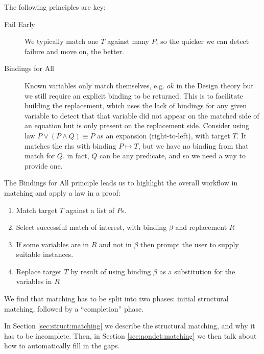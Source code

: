 The following principles are key:
\begin{description}
  \item[Fail Early]
    We typically match one $T$ against many $P$, so the quicker we
    can detect failure and move on, the better.
  \item[Bindings for All]
    Known variables only match themselves, e.g. $ok$ in the Design theory
    but we still require an explicit binding to be returned.
    This is to facilitate building the replacement,
    which uses the lack of bindings for any given variable to
    detect that that variable did not appear on the matched side of an equation
    but is only present on the replacement side.
    Consider using law $P \lor (P \land Q) \equiv P$
    as an expansion (right-to-left), with target $T$.
    It matches the rhs with binding $P \mapsto T$,
    but we have no binding from that match for $Q$.
    in fact, $Q$ can be any predicate, and so we need a way to provide one.
\end{description}
The Bindings for All principle leads us to highlight
the overall workflow in matching and apply a law in a proof:
\begin{enumerate}
  \item Match target $T$ against a list of $P$s.
  \item Select successful match of interest, with binding $\beta$
    and replacement $R$
  \item If some variables are in $R$ and not in $\beta$
      then prompt the user to supply suitable instances.
  \item Replace target $T$ by result of using binding $\beta$
   as a substitution for the variables in $R$
\end{enumerate}

We find that matching has to be split into two phases:
initial structural matching, followed by a ``completion'' phase.

In Section \ref{sec:struct:matching}
we describe the structural matching, and why it has to be incomplete.
Then, in Section \ref{sec:nondet:matching}
 we then talk about how to automatically fill in the gaps.
